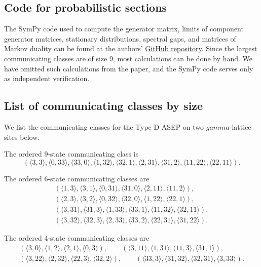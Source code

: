 \documentclass[10pt,a4paper]{amsart}
\numberwithin{equation}{section}
\theoremstyle{definition}
\def\gamma{gamma}
\begin{document}
\subsection{Code for probabilistic sections}
The SymPy code used to compute the generator matrix, limits of component generator matrices, stationary distributions, spectral gaps, and matrices of Markov duality can be found at the authors' \href{https://github.com/evaengel/stochastic-fusion}{GitHub repository}. Since the largest communicating classes are of size 9, most calculations can be done by hand. We have omitted such calculations from the paper, and the SymPy code serves only as independent verification.

\subsection{List of communicating classes by size} \label{subsection-commClasses}
We list the communicating classes for the Type D ASEP on two $\gamma$-lattice sites below.

The ordered 9-state communicating class is
\[( \langle 3, 3 \rangle,\langle 0, 33 \rangle, \langle 33,0 \rangle,\langle 1,32 \rangle,\langle 32,1 \rangle,\langle 2,31 \rangle, \langle 31,2 \rangle,\langle 11, 22 \rangle,\langle 22, 11 \rangle ).\]

The ordered 6-state communicating classes are
\begin{gather*}
( \langle 1, 3\rangle, \langle3, 1\rangle, \langle0, 31\rangle, \langle31, 0\rangle, \langle2, 11\rangle, \langle11, 2 \rangle ),\\
( \langle 2, 3\rangle, \langle3, 2\rangle, \langle0, 32\rangle, \langle32, 0\rangle, \langle1, 22\rangle, \langle22, 1\rangle ),\\
( \langle 3, 31\rangle, \langle31, 3\rangle, \langle1, 33\rangle, \langle33, 1\rangle, \langle11, 32\rangle, \langle32, 11\rangle),\\
( \langle 3, 32\rangle, \langle32, 3\rangle, \langle2, 33\rangle, \langle33, 2\rangle, \langle22, 31\rangle, \langle31, 22\rangle).
\end{gather*}

The ordered 4-state communicating classes are
\begin{gather*}
( \langle 3, 0\rangle, \langle1, 2\rangle, \langle2, 1\rangle, \langle0, 3\rangle),\qquad
(\langle 3, 11\rangle, \langle1, 31\rangle, \langle11, 3\rangle, \langle31, 1\rangle),\\
(\langle 3, 22\rangle, \langle2, 32\rangle, \langle22, 3\rangle, \langle32, 2\rangle),\qquad
(\langle 33, 3\rangle, \langle31, 32\rangle, \langle32, 31\rangle, \langle3, 33\rangle).
\end{gather*}
\end{document}
